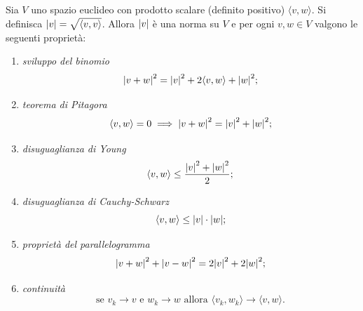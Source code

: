 \begin{theorem}
\label{th:spazio_euclideo}%
Sia $V$ uno spazio euclideo con prodotto scalare (definito positivo) $\langle v, w\rangle$.
Si definisca ${\left|v\right|} = \sqrt{\langle v,v\rangle}$.
Allora ${\left|v\right|}$ è una norma su $V$
e per ogni $v,w\in V$ valgono le seguenti proprietà:
\begin{enumerate}
\item \emph{sviluppo del binomio}%
%
\[
  {\left|v+w\right|}^2 = {\left|v\right|}^2 + 2 \langle v,w\rangle + {\left|w\right|}^2;
\]
\item \emph{teorema di Pitagora}%
%
%
\begin{equation}\label{eq:Pitagora}
  \langle v,w\rangle=0 \implies {\left|v+w\right|}^2 = {\left|v\right|}^2 + {\left|w\right|}^2;
\end{equation}
\item \emph{disuguaglianza di Young}%
%
%
\begin{equation}\label{eq:Young}
  \langle v,w\rangle \le \frac{{\left|v\right|}^2 + {\left|w\right|}^2}{2};
\end{equation}
\item \emph{disuguaglianza di Cauchy-Schwarz}%
%
%
%
\begin{equation}\label{eq:Cauchy_Schwarz}
   \langle v,w \rangle \le {\left|v\right|} \cdot {\left|w\right|};
\end{equation}
\item \emph{proprietà del parallelogramma}%
%
\begin{equation}\label{eq:parallelogramma}
  {\left|v+w\right|}^2 + {\left|v-w\right|}^2 = 2 {\left|v\right|}^2 + 2{\left|w\right|}^2;
\end{equation}
\item \emph{continuità}
\[
  \text{se $v_k\to v$ e $w_k\to w$ allora
  $\langle v_k,w_k\rangle \to \langle v,w \rangle$}.
\]
\end{enumerate}
\end{theorem}
%
